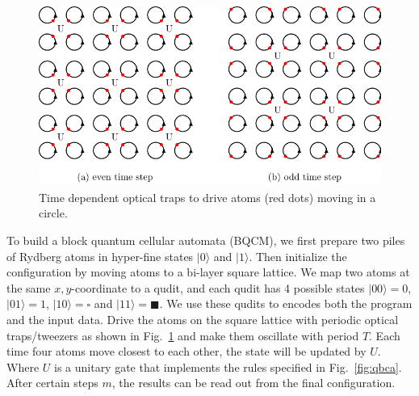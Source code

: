 \documentclass[a4paper]{article}
\newcommand*\circled[1]{\tikz[baseline=(char.base)]{
            \node[shape=circle,draw,inner sep=1pt] (char) {#1};}}
\newcommand{\<}{\langle}
\renewcommand{\>}{\rangle}
\begin{document}
\begin{figure}[th]
    \centering
    \includegraphics[scale=1]{images/bqca-circles.pdf}
    \caption{Time dependent optical traps to drive atoms (red dots) moving in a circle.}
    \label{fig:ablattice}
\end{figure}

To build a block quantum cellular automata (BQCM), \circled{1} we first prepare two piles of Rydberg atoms in hyper-fine states $|0\rangle$ and $|1\rangle$.
\circled{2} Then initialize the configuration by moving atoms to a bi-layer square lattice. We map two atoms at the same $x,y$-coordinate to a qudit, and each qudit has 4 possible states $|00\rangle = 0$, $|01\rangle=1$, $|10\rangle=\square$ and $|11\rangle=\blacksquare$.
We use these qudits to encodes both the program and the input data.
\circled{3} Drive the atoms on the square lattice with periodic optical traps/tweezers as shown in Fig.~\ref{fig:ablattice} and make them oscillate with period $T$.
Each time four atoms move closest to each other, the state will be updated by $U$.
Where $U$ is a unitary gate that implements the rules specified in Fig.~\ref{fig:qbca}.
After certain steps $m$, the results can be read out from the final configuration.
\end{document}
